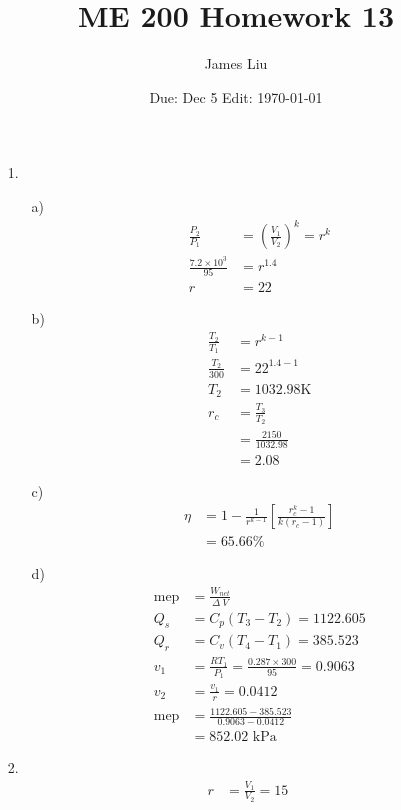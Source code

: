 \documentclass{article}
\date{Due: Dec 5 Edit: \today}
\title{ME 200 Homework 13}
\author{James Liu}
\begin{document}
\maketitle
\begin{itemize}
    \item [1.] 
    \begin{itemize}
        \item [a)]
        \begin{align*}
            \frac{P_2}{P_1}&=\left(\frac{V_1}{V_2}\right)^k=r^k\\
            \frac{7.2\times 10^3}{95}&=r^{1.4}\\
            r&=22
        \end{align*}
        \item [b)]
        \begin{align*}
            \frac{T_2}{T_1}&=r^{k-1}\\
            \frac{T_2}{300}&=22^{1.4-1}\\
            T_2&=1032.98 \text{K}\\
            r_c&=\frac{T_3}{T_2}\\
            &=\frac{2150}{1032.98}\\
            &=2.08
        \end{align*}
        \item [c)]
        \begin{align*}
            \eta &= 1-\frac{1}{r^{k-1}}\left[\frac{r_c^k-1}{k(r_c-1)}\right]\\
            &=65.66\%
        \end{align*}
        \item [d)]
        \begin{align*}
            \text{mep}&=\frac{W_{net}}{\Delta \ V}\\
            Q_s&=C_p(T_3-T_2)=1122.605\\
            Q_r&=C_v(T_4-T_1)=385.523\\
            v_1&=\frac{RT_1}{P_1}=\frac{0.287\times 300}{95}=0.9063\\
            v_2&=\frac{v_1}{r}=0.0412\\
            \text{mep}&=\frac{1122.605-385.523}{0.9063-0.0412}\\
            &=852.02 \text{ kPa}
        \end{align*}
    \end{itemize}
    \item [2.]
    \begin{align*}
        r&=\frac{V_1}{V_2}=15\\

\end{align*}
\end{itemize}
\end{document}
